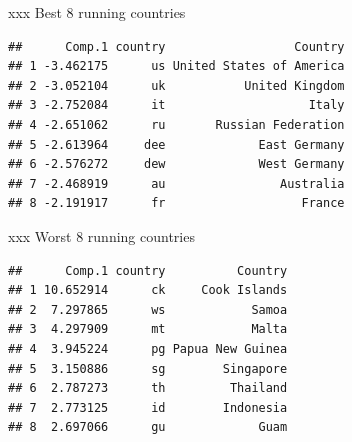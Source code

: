 \documentclass[ignorenonframetext,]{beamer}
\newenvironment{Shaded}{\begin{snugshade}}{\end{snugshade}}
\newcommand{\DataTypeTok}[1]{\textcolor[rgb]{0.13,0.29,0.53}{#1}}
\newcommand{\DecValTok}[1]{\textcolor[rgb]{0.00,0.00,0.81}{#1}}
\newcommand{\FloatTok}[1]{\textcolor[rgb]{0.00,0.00,0.81}{#1}}
\newcommand{\KeywordTok}[1]{\textcolor[rgb]{0.13,0.29,0.53}{\textbf{#1}}}
\newcommand{\NormalTok}[1]{#1}
\newcommand{\OperatorTok}[1]{\textcolor[rgb]{0.81,0.36,0.00}{\textbf{#1}}}
\newcommand{\StringTok}[1]{\textcolor[rgb]{0.31,0.60,0.02}{#1}}
\begin{document}
\begin{frame}[fragile]{xxx Best 8 running countries}
\protect\hypertarget{xxx-best-8-running-countries}{}

\begin{Shaded}
\end{Shaded}

\begin{verbatim}
##      Comp.1 country                  Country
## 1 -3.462175      us United States of America
## 2 -3.052104      uk           United Kingdom
## 3 -2.752084      it                    Italy
## 4 -2.651062      ru       Russian Federation
## 5 -2.613964     dee             East Germany
## 6 -2.576272     dew             West Germany
## 7 -2.468919      au                Australia
## 8 -2.191917      fr                   France
\end{verbatim}

\end{frame}

\begin{frame}[fragile]{xxx Worst 8 running countries}
\protect\hypertarget{xxx-worst-8-running-countries}{}

\begin{Shaded}
\end{Shaded}

\begin{verbatim}
##      Comp.1 country          Country
## 1 10.652914      ck     Cook Islands
## 2  7.297865      ws            Samoa
## 3  4.297909      mt            Malta
## 4  3.945224      pg Papua New Guinea
## 5  3.150886      sg        Singapore
## 6  2.787273      th         Thailand
## 7  2.773125      id        Indonesia
## 8  2.697066      gu             Guam
\end{verbatim}

\end{frame}
\end{document}
